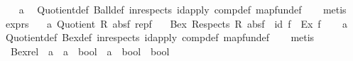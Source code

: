 \begin{isabellebody}
%
\isadelimproof
\ \ %
\endisadelimproof
%
\isatagproof
{}\isamarkupfalse%
\ a\ \isamarkupfalse%
\ Quotient{}{\isacharunderscore}{\kern0pt}def\ Ball{\isacharunderscore}{\kern0pt}def\ in{\isacharunderscore}{\kern0pt}respects\ id{\isacharunderscore}{\kern0pt}apply\ comp{\isacharunderscore}{\kern0pt}def\ map{\isacharunderscore}{\kern0pt}fun{\isacharunderscore}{\kern0pt}def\isanewline
\ \ \isamarkupfalse%
\ metis%
\endisatagproof
{\isafoldproof}%
%
\isadelimproof
\isanewline
%
\endisadelimproof
\isanewline
{}\isamarkupfalse%
\ ex{\isacharunderscore}{\kern0pt}prs{\isacharcolon}{\kern0pt}\isanewline
\ \ \ a{\isacharcolon}{\kern0pt}\ {\isachardoublequoteopen}Quotient{}\ R\ absf\ repf{\isachardoublequoteclose}\isanewline
\ \ \ {\isachardoublequoteopen}Bex\ {\isacharparenleft}{\kern0pt}Respects\ R{\isacharparenright}{\kern0pt}\ {\isacharparenleft}{\kern0pt}{\isacharparenleft}{\kern0pt}absf\ {\isacharminus}{\kern0pt}{\isacharminus}{\kern0pt}{\isacharminus}{\kern0pt}{\isachargreater}{\kern0pt}\ id{\isacharparenright}{\kern0pt}\ f{\isacharparenright}{\kern0pt}\ {\isacharequal}{\kern0pt}\ Ex\ f{\isachardoublequoteclose}\isanewline
%
\isadelimproof
\ \ %
\endisadelimproof
%
\isatagproof
{}\isamarkupfalse%
\ a\ \isamarkupfalse%
\ Quotient{}{\isacharunderscore}{\kern0pt}def\ Bex{\isacharunderscore}{\kern0pt}def\ in{\isacharunderscore}{\kern0pt}respects\ id{\isacharunderscore}{\kern0pt}apply\ comp{\isacharunderscore}{\kern0pt}def\ map{\isacharunderscore}{\kern0pt}fun{\isacharunderscore}{\kern0pt}def\isanewline
\ \ \isamarkupfalse%
\ metis%
\endisatagproof
{\isafoldproof}%
%
\isadelimproof
%
\endisadelimproof
%
\isadelimdocument
%
\endisadelimdocument
%
\isatagdocument
%
\isamarkuptrue%
%
\endisatagdocument
{\isafolddocument}%
%
\isadelimdocument
%
\endisadelimdocument
{}\isamarkupfalse%
\isanewline
\ \ Bex{}{\isacharunderscore}{\kern0pt}rel\ {\isacharcolon}{\kern0pt}{\isacharcolon}{\kern0pt}\ {\isachardoublequoteopen}{\isacharparenleft}{\kern0pt}{\isacharprime}{\kern0pt}a\ {\isasymRightarrow}\ {\isacharprime}{\kern0pt}a\ {\isasymRightarrow}\ bool{\isacharparenright}{\kern0pt}\ {\isasymRightarrow}\ {\isacharparenleft}{\kern0pt}{\isacharprime}{\kern0pt}a\ {\isasymRightarrow}\ bool{\isacharparenright}{\kern0pt}\ {\isasymRightarrow}\ bool{\isachardoublequoteclose}\isanewline

\end{isabellebody}
